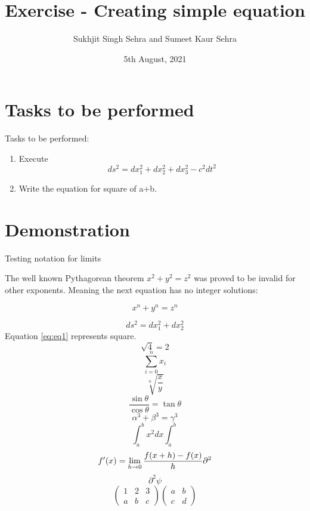 \documentclass{article}
\title{Exercise - Creating simple equation}
\author{Sukhjit Singh Sehra and Sumeet Kaur Sehra}
\date{5th August, 2021}
\begin{document}
	\maketitle
	
	\section*{Tasks to be performed}
	Tasks to be performed:
	\begin{enumerate}
		\item Execute \[ ds^2 = dx_1^2 + dx_2^2 + dx_3^2 - c^2 dt^2 \]
		\item Write the equation for square of a+b.
	\end{enumerate}
	\section*{Demonstration}
Testing notation for limits
 

 
	
	
The well known Pythagorean theorem \(x^2 + y^2 = z^2\) was 
proved to be invalid for other exponents. 
Meaning the next equation has no integer solutions:

\[ x^n + y^n = z^n \]

\begin{equation}
	ds^2=dx_1^2+dx_2^2
	\label{eq:eq1}
	\end{equation}
Equation \ref{eq:eq1} represents square.
\begin{equation}
	\sqrt{4}=2
	\end{equation}
\begin{equation}
	\sum_{i=0}^{n}x_i
	\end{equation}
\begin{equation}
	\sqrt[n]{\frac{x}{y}}
	\end{equation}
\begin{equation}
	\frac{\sin\theta}{\cos\theta}=\tan\theta
	\end{equation}
\begin{equation}
	\alpha^3+\beta^3=\gamma^3
\end{equation}
\begin{equation}
\int_{a}^{b} x^2 dx 
\int_{a}^{b}
\end{equation}
\begin{equation}
f'(x) = \lim\limits_{h \rightarrow 0} \frac{f(x+h) - f(x)}{h}  \\ \partial^2
\end{equation}
\begin{equation}
	\partial^2
	\psi
\end{equation}
\begin{equation}
	\left(   
	\begin{matrix}
		1 & 2 & 3\\
		a & b & c
	\end{matrix}\right)
\begin{pmatrix}
	a & b\\ 
	c & d
\end{pmatrix}
	\end{equation}
\end{document}
